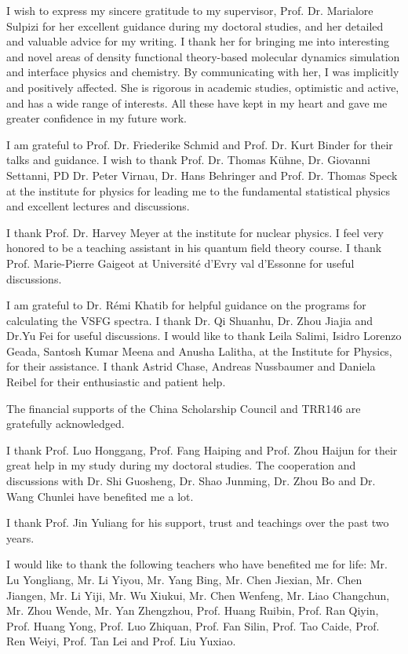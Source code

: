 \documentclass[
11pt, %
ngerman,
english, %
singlespacing, %
headsepline, %
]{MastersDoctoralThesis} %
\begin{document}
\begin{acknowledgements}
\addchaptertocentry{\acknowledgementname} %
I wish to express my sincere gratitude to my supervisor,
Prof. Dr. Marialore Sulpizi for her excellent guidance during my doctoral studies, and her detailed and valuable advice for my writing.
I thank her for bringing me into interesting and novel areas of density functional theory-based molecular dynamics simulation 
and interface physics and chemistry. By communicating with her, I was implicitly and positively affected. 
She is rigorous in academic studies, optimistic and active, and has a wide range of interests. 
All these have kept in my heart and gave me greater confidence in my future work.

%
I am grateful to Prof. Dr. Friederike Schmid  and Prof. Dr. Kurt Binder for their talks and guidance.
I wish to thank Prof. Dr. Thomas Kühne, Dr. Giovanni Settanni, PD Dr. Peter
Virnau, Dr. Hans Behringer and Prof. Dr. Thomas Speck at the institute for
physics for leading me to the fundamental statistical physics and excellent lectures and discussions. 

%
I thank Prof. Dr. Harvey Meyer at the institute for nuclear physics. 
I feel very honored to be a teaching assistant in his quantum field theory course. 
%
I thank Prof. Marie-Pierre Gaigeot at Universit{\'e} d'Evry val d'Essonne for useful discussions.

%
I am grateful to Dr. R\'emi Khatib for helpful guidance on the programs for calculating the VSFG spectra. 
I thank Dr. Qi Shuanhu, Dr. Zhou Jiajia and Dr.Yu Fei for useful discussions. 
I would like to thank Leila Salimi, Isidro Lorenzo Geada, Santosh Kumar Meena and Anusha Lalitha, 
at the Institute for Physics, for their assistance.
%
I thank Astrid Chase, Andreas Nussbaumer and Daniela Reibel for their enthusiastic and patient help.

%
The financial supports of the China Scholarship Council and TRR146 are gratefully acknowledged.

%
I thank Prof. Luo Honggang, Prof. Fang Haiping and Prof. Zhou Haijun for their great help in my study during my doctoral studies. 
The cooperation and discussions with Dr. Shi Guosheng, Dr. Shao Junming, Dr. Zhou Bo and Dr. Wang Chunlei have benefited me a lot. 

%
I thank Prof. Jin Yuliang for his support, trust and teachings over the past two years.

%
I would like to thank the following teachers who have benefited me for life:
Mr. Lu Yongliang, Mr. Li Yiyou, 
Mr. Yang Bing, Mr. Chen Jiexian, Mr. Chen Jiangen, Mr. Li Yiji,
Mr. Wu Xiukui, Mr. Chen Wenfeng, Mr. Liao Changchun, Mr. Zhou Wende,
Mr. Yan Zhengzhou, Prof. Huang Ruibin, Prof. Ran Qiyin, Prof. Huang Yong, Prof. Luo Zhiquan, Prof. Fan Silin, Prof. Tao Caide, Prof. Ren Weiyi, 
Prof. Tan Lei and Prof. Liu Yuxiao.


\end{acknowledgements}
\end{document}
